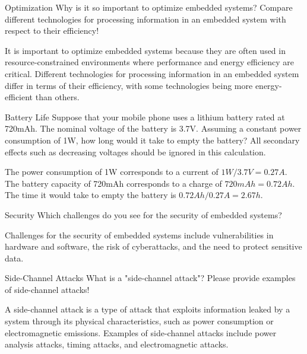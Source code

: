 \documentclass{article}
\begin{document}
\begin{exercise}{Optimization}
  Why is it so important to optimize embedded systems? Compare different technologies for processing information in an embedded system with respect to their efficiency!

  \begin{solution}
    It is important to optimize embedded systems because they are often used in resource-constrained environments where performance and energy efficiency are critical. Different technologies for processing information in an embedded system differ in terms of their efficiency, with some technologies being more energy-efficient than others.
  \end{solution}
\end{exercise}

\begin{exercise}{Battery Life}
  Suppose that your mobile phone uses a lithium battery rated at 720mAh. The nominal voltage of the battery is 3.7V. Assuming a constant power consumption of 1W, how long would it take to empty the battery? All secondary effects such as decreasing voltages should be ignored in this calculation.

  \begin{solution}
    The power consumption of 1W corresponds to a current of $1W / 3.7V = 0.27A$. The battery capacity of 720mAh corresponds to a charge of $720mAh = 0.72Ah$. The time it would take to empty the battery is $0.72Ah / 0.27A = 2.67h$.
  \end{solution}
\end{exercise}

\begin{exercise}{Security}
  Which challenges do you see for the security of embedded systems?

  \begin{solution}
    Challenges for the security of embedded systems include vulnerabilities in hardware and software, the risk of cyberattacks, and the need to protect sensitive data.
  \end{solution}
\end{exercise}

\begin{exercise}{Side-Channel Attacks}
  What is a "side-channel attack"? Please provide examples of side-channel attacks!

  \begin{solution}
    A side-channel attack is a type of attack that exploits information leaked by a system through its physical characteristics, such as power consumption or electromagnetic emissions. Examples of side-channel attacks include power analysis attacks, timing attacks, and electromagnetic attacks.
  \end{solution}
\end{exercise}
\end{document}
